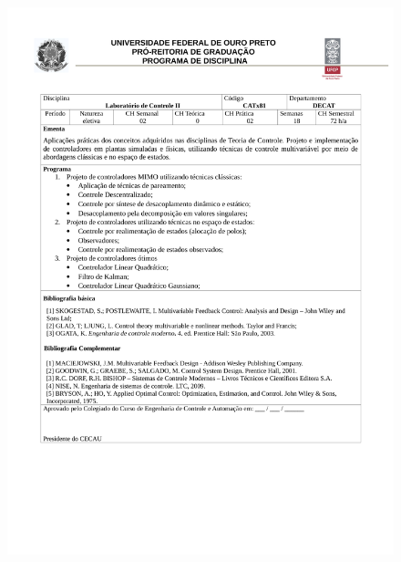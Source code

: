 \begin{figure}[p]
	\centering 
	\includegraphics[scale=0.7]{capitulos/anexo1-programas-disciplina/p83.pdf}
\end{figure}

